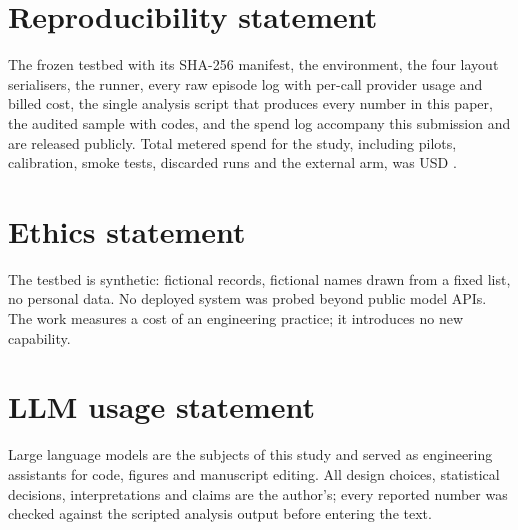 \section*{Reproducibility statement}
The frozen testbed with its SHA-256 manifest, the environment, the four layout serialisers, the runner, every raw episode log with per-call provider usage and billed cost, the single analysis script that produces every number in this paper, the audited sample with codes, and the spend log accompany this submission and are released publicly. Total metered spend for the study, including pilots, calibration, smoke tests, discarded runs and the external arm, was USD .

\section*{Ethics statement}
The testbed is synthetic: fictional records, fictional names drawn from a fixed list, no personal data. No deployed system was probed beyond public model APIs. The work measures a cost of an engineering practice; it introduces no new capability.

\section*{LLM usage statement}
Large language models are the subjects of this study and served as engineering assistants for code, figures and manuscript editing. All design choices, statistical decisions, interpretations and claims are the author's; every reported number was checked against the scripted analysis output before entering the text.

